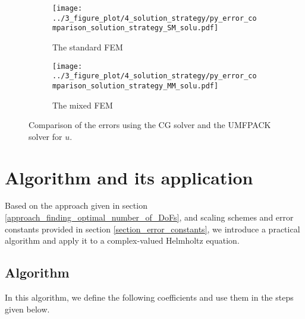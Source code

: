 \documentclass[review,3p]{elsarticle}
\begin{document}
\begin{figure}[!ht]
	\centering
    \begin{subfigure}{6.0cm}
        \texttt{[image: ../3\_figure\_plot/4\_solution\_strategy/py\_error\_comparison\_solution\_strategy\_SM\_solu.pdf]}
        \caption{The standard FEM}
        \label{py_bench_Pois_SM_error_solution_strategy_solu}
    \end{subfigure}
    \hspace{-0.2cm}
    \begin{subfigure}{6.0cm}	                		 	
        \texttt{[image: ../3\_figure\_plot/4\_solution\_strategy/py\_error\_comparison\_solution\_strategy\_MM\_solu.pdf]}
        \caption{The mixed FEM}
        \label{py_bench_Pois_MM_error_solution_strategy_solu}
    \end{subfigure}
\caption{Comparison of the errors using the CG solver and the UMFPACK solver for $u$.}
\label{py_bench_Pois_error_solution_strategy}
\end{figure}



\section{Algorithm and its application}		\label{section_algorithm_application}

Based on the approach given in section \ref{approach_finding_optimal_number_of_DoFs}, and scaling schemes and error constants provided in section \ref{section_error_constants}, we introduce a practical algorithm and apply it to a complex-valued Helmholtz equation.

\subsection{Algorithm}

In this algorithm, we define the following coefficients and use them in the steps given below.
\end{document}
